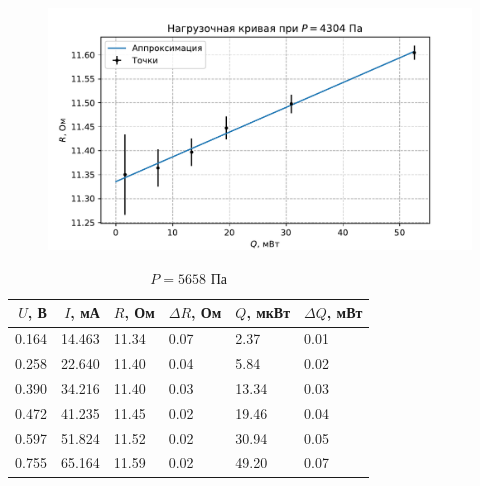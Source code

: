 \begin{figure}[H]\centering\includegraphics[width=\textwidth]{graphs/RQ4304.46.pdf}\end{figure}\begin{table}[H]
\centering
\caption{$P = 5658$ Па}
\begin{tabular}{rrllll}
\hline
 $U$, В &  $I$, мА &     $R$, Ом & $\Delta R$, Ом &     $Q$, мкВт & $\Delta Q$, мВт \\ \hline
0.164 & 14.463 & 11.34 &           0.07 &  2.37 &            0.01 \\ \hline
0.258 & 22.640 & 11.40 &           0.04 &  5.84 &            0.02 \\ \hline
0.390 & 34.216 & 11.40 &           0.03 & 13.34 &            0.03 \\ \hline
0.472 & 41.235 & 11.45 &           0.02 & 19.46 &            0.04 \\ \hline
0.597 & 51.824 & 11.52 &           0.02 & 30.94 &            0.05 \\ \hline
0.755 & 65.164 & 11.59 &           0.02 & 49.20 &            0.07 \\ \hline
\end{tabular}
\end{table}
